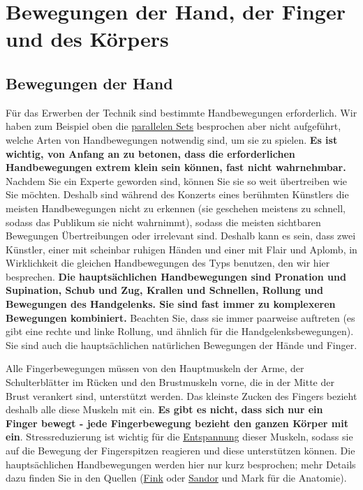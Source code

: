 
\section{Bewegungen der Hand, der Finger und des Körpers}
\label{c1iii4}

\subsection{Bewegungen der Hand}

Für das Erwerben der Technik sind bestimmte Handbewegungen erforderlich.
Wir haben zum Beispiel oben die \hyperref[c1ii11]{parallelen Sets} besprochen aber nicht aufgeführt, welche Arten von Handbewegungen notwendig sind, um sie zu spielen.
\textbf{Es ist wichtig, von Anfang an zu betonen, dass die erforderlichen Handbewegungen extrem klein sein können, fast nicht wahrnehmbar.}
Nachdem Sie ein Experte geworden sind, können Sie sie so weit übertreiben wie Sie möchten.
Deshalb sind während des Konzerts eines berühmten Künstlers die meisten Handbewegungen nicht zu erkennen (sie geschehen meistens zu schnell, sodass das Publikum sie nicht wahrnimmt), sodass die meisten sichtbaren Bewegungen Übertreibungen oder irrelevant sind.
Deshalb kann es sein, dass zwei Künstler, einer mit scheinbar ruhigen Händen und einer mit Flair und Aplomb, in Wirklichkeit die gleichen Handbewegungen des Typs benutzen, den wir hier besprechen.
\textbf{Die hauptsächlichen Handbewegungen sind Pronation und Supination, Schub und Zug, Krallen und Schnellen, Rollung und Bewegungen des Handgelenks.
Sie sind fast immer zu komplexeren Bewegungen kombiniert.}
Beachten Sie, dass sie immer paarweise auftreten (es gibt eine rechte und linke Rollung, und ähnlich für die Handgelenksbewegungen).
Sie sind auch die hauptsächlichen natürlichen Bewegungen der Hände und Finger.

Alle Fingerbewegungen müssen von den Hauptmuskeln der Arme, der Schulterblätter im Rücken und den Brustmuskeln vorne, die in der Mitte der Brust verankert sind, unterstützt werden.
Das kleinste Zucken des Fingers bezieht deshalb alle diese Muskeln mit ein.
\textbf{Es gibt es nicht, dass sich nur ein Finger bewegt - jede Fingerbewegung bezieht den ganzen Körper mit ein}.
Stressreduzierung ist wichtig für die \hyperref[c1ii14]{Entspannung} dieser Muskeln, sodass sie auf die Bewegung der Fingerspitzen reagieren und diese unterstützen können.
Die hauptsächlichen Handbewegungen werden hier nur kurz besprochen; mehr Details dazu finden Sie in den Quellen (\hyperref[Fink]{Fink} oder \hyperref[Sandor]{Sandor} und Mark für die Anatomie).


